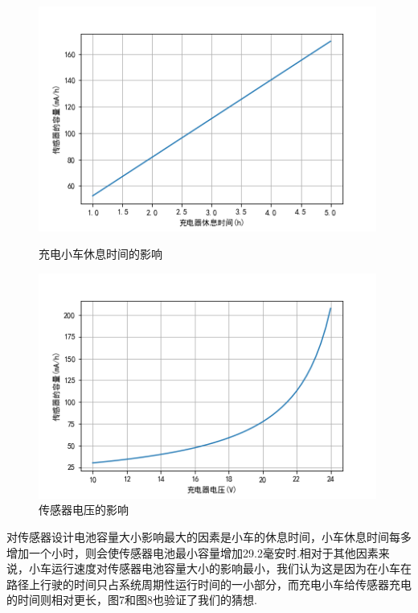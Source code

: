 \documentclass{whutmod}
\begin{document}
\begin{figure}[H]	
	\begin{minipage}[t]{0.48\textwidth}
		\centering
		\includegraphics[width=0.99\textwidth]{breakTimg.png}	
		
		\caption{充电小车休息时间的影响}
	\end{minipage}
	\qquad
	\begin{minipage}[t]{0.48\textwidth}
		\centering
		\includegraphics[width=0.99\textwidth]{V.png}
		
		\caption{传感器电压的影响}	
	\end{minipage}
	\label{fig:enhance}
	
\end{figure}

对传感器设计电池容量大小影响最大的因素是小车的休息时间，小车休息时间每多增加一个小时，则会使传感器电池最小容量增加29.2毫安时.相对于其他因素来说，小车运行速度对传感器电池容量大小的影响最小，我们认为这是因为在小车在路径上行驶的时间只占系统周期性运行时间的一小部分，而充电小车给传感器充电的时间则相对更长，图7和图8也验证了我们的猜想.
\end{document}
